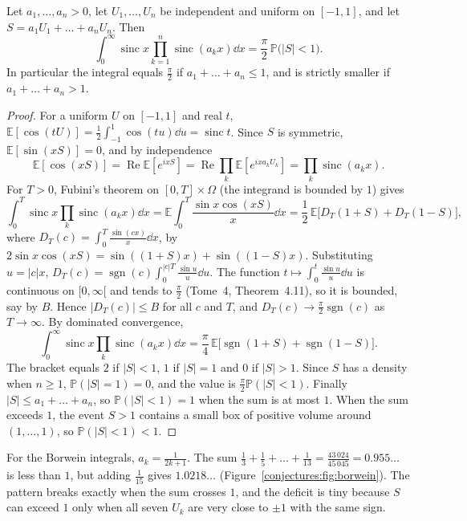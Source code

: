 \begin{theorem}\label{conjectures:thm:borwein}
Let $a_1,\dots,a_n>0$, let $U_1,\dots,U_n$ be independent and uniform on $[-1,1]$, and let $S=a_1U_1+\dots+a_nU_n$. Then
\[
\int_0^\infty\operatorname{sinc}x\prod_{k=1}^n\operatorname{sinc}(a_kx)\dd x=\frac\pi2\,\mathbb P\bigl(|S|<1\bigr).
\]
In particular the integral equals $\frac\pi2$ if $a_1+\dots+a_n\le1$, and is strictly smaller if $a_1+\dots+a_n>1$.
\end{theorem}
\begin{proof}
For a uniform $U$ on $[-1,1]$ and real $t$, $\mathbb E[\cos(tU)]=\frac12\int_{-1}^1\cos(tu)\dd u=\operatorname{sinc}t$. Since $S$ is symmetric,
$\mathbb E[\sin(xS)]=0$, and by independence
\[
\mathbb E[\cos(xS)]=\operatorname{Re}\mathbb E[e^{ixS}]=\operatorname{Re}\prod_k\mathbb E[e^{ixa_kU_k}]=\prod_k\operatorname{sinc}(a_kx).
\]
For $T>0$, Fubini's theorem on $[0,T]\times\Omega$ (the integrand is bounded by $1$) gives
\[
\int_0^T\operatorname{sinc}x\prod_k\operatorname{sinc}(a_kx)\dd x=\mathbb E\int_0^T\frac{\sin x\cos(xS)}x\dd x=\frac12\,\mathbb E\bigl[D_T(1+S)+D_T(1-S)\bigr],
\]
where $D_T(c)=\int_0^T\frac{\sin(cx)}x\dd x$, by $2\sin x\cos(xS)=\sin((1+S)x)+\sin((1-S)x)$. Substituting $u=|c|x$, $D_T(c)=\operatorname{sgn}(c)\int_0^{|c|T}\frac{\sin u}u\dd u$.
The function $t\mapsto\int_0^t\frac{\sin u}u\dd u$ is continuous on $[0,\infty[$ and tends to $\frac\pi2$ (Tome~4, Theorem~4.11), so it is bounded, say by $B$.
Hence $|D_T(c)|\le B$ for all $c$ and $T$, and $D_T(c)\to\frac\pi2\operatorname{sgn}(c)$ as $T\to\infty$. By dominated convergence,
\[
\int_0^\infty\operatorname{sinc}x\prod_k\operatorname{sinc}(a_kx)\dd x=\frac\pi4\,\mathbb E\bigl[\operatorname{sgn}(1+S)+\operatorname{sgn}(1-S)\bigr].
\]
The bracket equals $2$ if $|S|<1$, $1$ if $|S|=1$ and $0$ if $|S|>1$. Since $S$ has a density when $n\ge1$, $\mathbb P(|S|=1)=0$, and the value is
$\frac\pi2\mathbb P(|S|<1)$. Finally $|S|\le a_1+\dots+a_n$, so $\mathbb P(|S|<1)=1$ when the sum is at most $1$. When the sum exceeds $1$, the event
$S>1$ contains a small box of positive volume around $(1,\dots,1)$, so $\mathbb P(|S|<1)<1$.
\end{proof}

For the Borwein integrals, $a_k=\frac1{2k+1}$. The sum $\frac13+\frac15+\dots+\frac1{13}=\frac{43\,024}{45\,045}=0.955\ldots$ is less than $1$, but adding $\frac1{15}$
gives $1.0218\ldots$ (Figure~\ref{conjectures:fig:borwein}). The pattern breaks exactly when the sum crosses $1$, and the deficit is tiny because $S$ can exceed $1$ only
when all seven $U_k$ are very close to $\pm1$ with the same sign.

